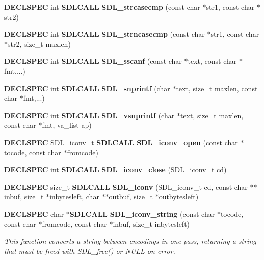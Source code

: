 \begin{DoxyCompactItemize}
\item 
{\bf D\+E\+C\+L\+S\+P\+E\+C} int {\bf S\+D\+L\+C\+A\+L\+L} {\bfseries S\+D\+L\+\_\+strcasecmp} (const char $\ast$str1, const char $\ast$str2)\label{_s_d_l__stdinc_8h_a1de324579fee4225e390df0a7b485d17}

\item 
{\bf D\+E\+C\+L\+S\+P\+E\+C} int {\bf S\+D\+L\+C\+A\+L\+L} {\bfseries S\+D\+L\+\_\+strncasecmp} (const char $\ast$str1, const char $\ast$str2, size\+\_\+t maxlen)\label{_s_d_l__stdinc_8h_ae2b36260891291943d2c8f7a6b991847}

\item 
{\bf D\+E\+C\+L\+S\+P\+E\+C} int {\bf S\+D\+L\+C\+A\+L\+L} {\bfseries S\+D\+L\+\_\+sscanf} (const char $\ast$text, const char $\ast$fmt,...)\label{_s_d_l__stdinc_8h_a036a33efecd221ef8760010e5bca9d86}

\item 
{\bf D\+E\+C\+L\+S\+P\+E\+C} int {\bf S\+D\+L\+C\+A\+L\+L} {\bfseries S\+D\+L\+\_\+snprintf} (char $\ast$text, size\+\_\+t maxlen, const char $\ast$fmt,...)\label{_s_d_l__stdinc_8h_a4282a001a36dfd2286c41a3685281e5c}

\item 
{\bf D\+E\+C\+L\+S\+P\+E\+C} int {\bf S\+D\+L\+C\+A\+L\+L} {\bfseries S\+D\+L\+\_\+vsnprintf} (char $\ast$text, size\+\_\+t maxlen, const char $\ast$fmt, va\+\_\+list ap)\label{_s_d_l__stdinc_8h_abdef8ba556177f8a9395139997e6cb40}

\item 
{\bf D\+E\+C\+L\+S\+P\+E\+C} S\+D\+L\+\_\+iconv\+\_\+t {\bf S\+D\+L\+C\+A\+L\+L} {\bfseries S\+D\+L\+\_\+iconv\+\_\+open} (const char $\ast$tocode, const char $\ast$fromcode)\label{_s_d_l__stdinc_8h_a0ba254663bb7d4b49eaa414d4533c6b5}

\item 
{\bf D\+E\+C\+L\+S\+P\+E\+C} int {\bf S\+D\+L\+C\+A\+L\+L} {\bfseries S\+D\+L\+\_\+iconv\+\_\+close} (S\+D\+L\+\_\+iconv\+\_\+t cd)\label{_s_d_l__stdinc_8h_a92eeaa95348c308ebd882ca85eccd684}

\item 
{\bf D\+E\+C\+L\+S\+P\+E\+C} size\+\_\+t {\bf S\+D\+L\+C\+A\+L\+L} {\bfseries S\+D\+L\+\_\+iconv} (S\+D\+L\+\_\+iconv\+\_\+t cd, const char $\ast$$\ast$inbuf, size\+\_\+t $\ast$inbytesleft, char $\ast$$\ast$outbuf, size\+\_\+t $\ast$outbytesleft)\label{_s_d_l__stdinc_8h_aeef39b9728425f231fc3e019ffa6c9ea}

\item 
{\bf D\+E\+C\+L\+S\+P\+E\+C} char $\ast${\bf S\+D\+L\+C\+A\+L\+L} {\bf S\+D\+L\+\_\+iconv\+\_\+string} (const char $\ast$tocode, const char $\ast$fromcode, const char $\ast$inbuf, size\+\_\+t inbytesleft)\label{_s_d_l__stdinc_8h_a43f6bd27a2e52c2d9ca629cb1a150bfd}

\begin{DoxyCompactList}\small\item\em This function converts a string between encodings in one pass, returning a string that must be freed with S\+D\+L\+\_\+free() or N\+U\+L\+L on error. \end{DoxyCompactList}\end{DoxyCompactItemize}
